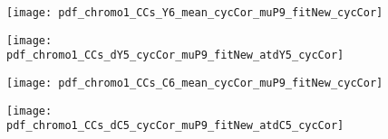 \clearpage



\begin{figure}
	\centering
	\texttt{[image: pdf\_chromo1\_CCs\_Y6\_mean\_cycCor\_muP9\_fitNew\_cycCor]}
	\clearpage %
	\label{fig:XXX:XXX}
\end{figure}	

\clearpage



\begin{figure}
	\centering
	\texttt{[image: pdf\_chromo1\_CCs\_dY5\_cycCor\_muP9\_fitNew\_atdY5\_cycCor]}
	\clearpage %
	\label{fig:XXX:XXX}
\end{figure}	

\clearpage



\begin{figure}
	\centering
	\texttt{[image: pdf\_chromo1\_CCs\_C6\_mean\_cycCor\_muP9\_fitNew\_cycCor]}
	\clearpage %
	\label{fig:XXX:XXX}
\end{figure}	

\clearpage



\begin{figure}
	\centering
	\texttt{[image: pdf\_chromo1\_CCs\_dC5\_cycCor\_muP9\_fitNew\_atdC5\_cycCor]}
	\clearpage %
	\label{fig:XXX:XXX}
\end{figure}	

\clearpage



